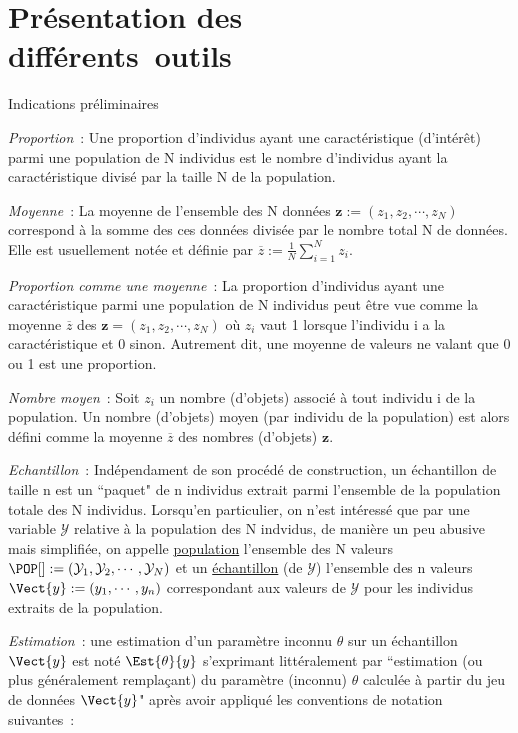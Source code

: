 \documentclass[10pt]{report}
\begin{document}
\chapter{Présentation des\\ différents~outils}\label{TdPres}
\begin{IndicList}{Indications préliminaires} 
\item \textit{Proportion}~: Une proportion d'individus ayant une caractéristique (d'intérêt) parmi une population de N individus est le nombre d'individus ayant la caractéristique divisé par la taille N de la population.
\item \textit{Moyenne}~: La moyenne de l'ensemble des N données $\textbf{z}:=(z_1,z_2,\cdots,z_N)$ correspond à la somme des ces données divisée par le nombre total N de données. Elle est usuellement notée et définie par $\overline{z}:=\displaystyle\frac1N\sum_{i=1}^N z_i$.    
\item \textit{Proportion comme une moyenne}~: La proportion d'individus ayant une caractéristique parmi une population de N individus peut être vue comme la moyenne $\overline{z}$ des $\textbf{z}=(z_1,z_2,\cdots,z_N)$ où $z_i$ vaut 1 lorsque l'individu i a la caractéristique et 0 sinon. Autrement dit, une moyenne de valeurs ne valant que 0 ou 1 est une proportion. 
\item \textit{Nombre moyen}~: Soit $z_i$ un nombre (d'objets) associé à tout individu i de la population. Un nombre (d'objets) moyen (par individu de la population) est alors défini comme la moyenne $\overline{z}$ des nombres (d'objets) $\textbf{z}$.
\item \textit{Echantillon}~: Indépendament de son procédé de construction, un échantillon de taille n est un ``paquet" de n individus extrait parmi l'ensemble de la population totale des N individus. Lorsqu'en particulier, on n'est intéressé que par une variable $\mathcal{Y}$ relative à la population des N indvidus, de manière un peu abusive mais simplifiée, on appelle \underline{population} l'ensemble des N valeurs $\POP[]:=(\mathcal{Y}_1,\mathcal{Y}_2,\cdots,\mathcal{Y}_N)$ et un \underline{échantillon} (de $\mathcal{Y}$) l'ensemble des n valeurs $\Vect{y}:=(y_1,\cdots,y_n)$ correspondant aux valeurs de $\mathcal{Y}$ pour les individus extraits de la population. 
\item \textit{Estimation}~: une estimation d'un paramètre inconnu $\theta$ sur un échantillon $\Vect{y}$ est noté $\Est{\theta}{y}$ s'exprimant littéralement par ``estimation (ou plus généralement remplaçant) du paramètre (inconnu) $\theta$ calculée à partir du jeu de données $\Vect{y}$" après avoir appliqué les conventions de notation suivantes~: \begin{enumerate}

\end{enumerate}
\end{IndicList}
\end{document}
